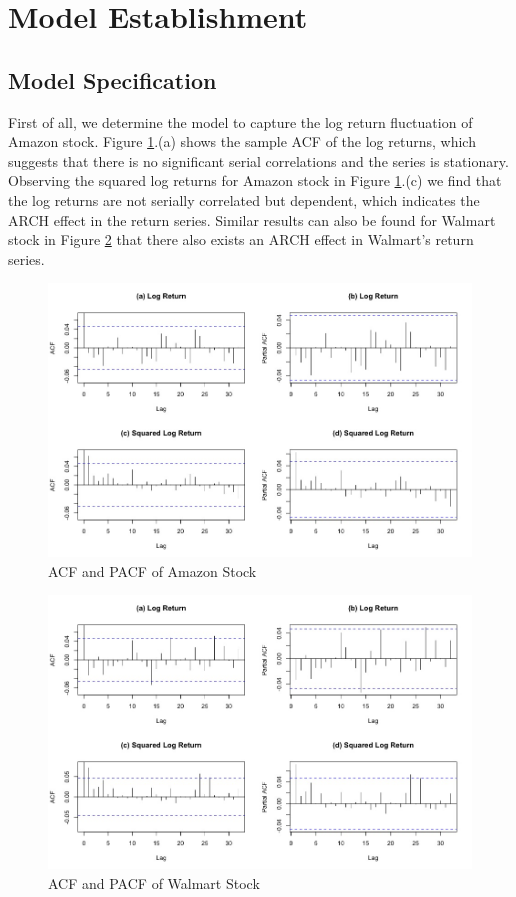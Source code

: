 \documentclass[paper=a4, fontsize=13pt]{article}
\begin{document}
\section{Model Establishment}
\subsection{Model Specification}
First of all, we determine the model to capture the log return fluctuation of Amazon stock. Figure \ref{cf_AMZN}.(a) shows the sample ACF of the log returns, which suggests that there is no significant serial correlations and the series is stationary. Observing the squared log returns for Amazon stock in Figure \ref{cf_AMZN}.(c) we find that the log returns are not serially correlated but dependent, which indicates the ARCH effect in the return series. Similar results can also be found for Walmart stock in Figure \ref{cf_WMT} that there also exists an ARCH effect in Walmart's return series.

\begin{figure}[!htbp]
\centering
\includegraphics[scale = 0.4]{img/cf_AMZN}
\caption{ACF and PACF of Amazon Stock}
\label{cf_AMZN}
\end{figure}

\begin{figure}[!htbp]
\centering
\includegraphics[scale = 0.4]{img/cf_WMT}
\caption{ACF and PACF of Walmart Stock}
\label{cf_WMT}
\end{figure}
\end{document}
